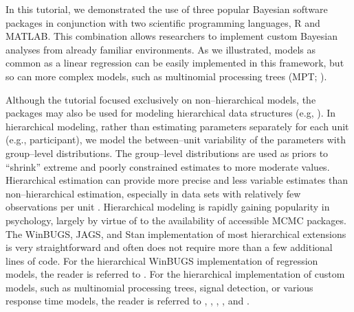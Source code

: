 {In this tutorial, we demonstrated the use of three popular Bayesian software packages in conjunction with two scientific programming languages, R and MATLAB. This combination allows researchers to implement custom Bayesian analyses from already familiar environments. As we illustrated, models as common as a linear regression can be easily implemented in this framework, but so can more complex models, such as multinomial processing trees (MPT; ).} 

{Although the tutorial focused exclusively on non--hierarchical models, the packages may also be used for modeling hierarchical data structures (e.g, ). In hierarchical modeling, rather than estimating parameters separately for each unit (e.g., participant), we model the between--unit variability of the parameters with group--level distributions. The group--level distributions are used as priors to ``shrink'' extreme and poorly constrained estimates to more moderate values. Hierarchical estimation can provide more precise and less variable estimates than non--hierarchical estimation, especially in data sets with relatively few observations per unit \cite{FarrellLudwig2008,RouderEtAl2005}. Hierarchical modeling is rapidly gaining popularity in psychology, largely by virtue of to the availability of accessible MCMC packages. The WinBUGS, JAGS, and Stan implementation of most hierarchical extensions is very straightforward and often does not require more than a few additional lines of code. For the hierarchical WinBUGS implementation of regression models, the reader is referred to . For the hierarchical implementation of custom models, such as multinomial processing trees, signal detection, or various response time models, the reader is referred to , , , ,  and .}

